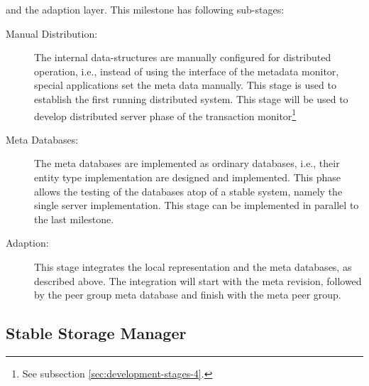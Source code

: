 \documentclass[a4paper, 10pt]{book}
\begin{document}
\begin{description}
                                        and the adaption layer. This milestone has following sub-stages:
                                        \begin{description}
                                            \item[Manual Distribution:] The internal data-structures are
                                                manually configured for distributed operation, i.e., instead of
                                                using the interface of the metadata monitor, special applications
                                                set the meta data manually. This stage is used to establish the
                                                first running distributed system. This stage will be used to
                                                develop distributed server phase of the transaction
                                                monitor\footnote{See subsection \vref{sec:development-stages-4}.}
                                            \item[Meta Databases:] The meta databases are implemented as
                                                ordinary databases, i.e., their entity type implementation are
                                                designed and implemented. This phase allows the testing of the
                                                databases atop of a stable system, namely the single server
                                                implementation. This stage can be implemented in parallel to the
                                                last milestone.
                                            \item[Adaption:] This stage integrates the local representation and
                                                the meta databases, as described above. The integration will start
                                                with the meta revision, followed by the peer group meta database
                                                and finish with the meta peer group. 
                                        \end{description}
                                \end{description}


                                \subsection{Stable Storage Manager}
                                \label{sec:stable-stor-manag}
\end{document}
